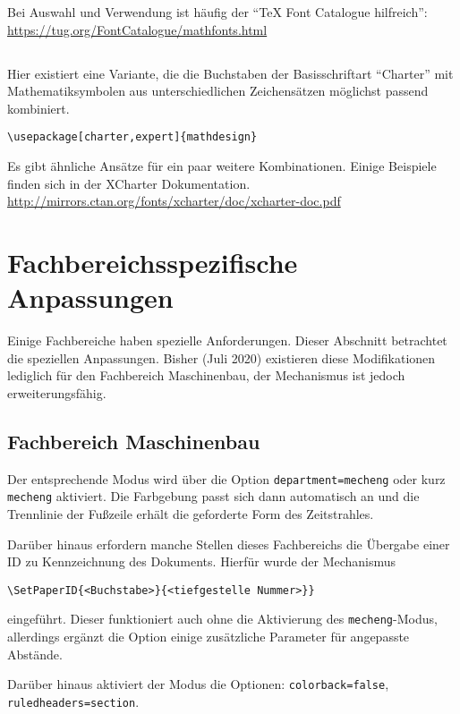 \documentclass[
	german,
	accentcolor=9c,%
	]{tudapub}
\let\code\texttt
\begin{document}
Bei Auswahl und Verwendung ist häufig der \enquote{\TeX{} Font Catalogue hilfreich}: \url{https://tug.org/FontCatalogue/mathfonts.html}

\subsection{}
Hier existiert eine Variante, die die Buchstaben der Basisschriftart \enquote{Charter} mit Mathematiksymbolen aus unterschiedlichen Zeichensätzen möglichst passend kombiniert.

\begin{verbatim}
\usepackage[charter,expert]{mathdesign}
\end{verbatim}

Es gibt ähnliche Ansätze für ein paar weitere Kombinationen. Einige Beispiele finden sich in der XCharter Dokumentation. \url{http://mirrors.ctan.org/fonts/xcharter/doc/xcharter-doc.pdf}


\section{Fachbereichsspezifische Anpassungen}
Einige Fachbereiche haben spezielle Anforderungen. Dieser Abschnitt betrachtet die speziellen Anpassungen. Bisher (Juli 2020) existieren diese Modifikationen lediglich für den Fachbereich Maschinenbau, der Mechanismus ist jedoch erweiterungsfähig.


\subsection{Fachbereich Maschinenbau}
Der entsprechende Modus wird über die Option \code{department=mecheng} oder kurz \code{mecheng} aktiviert. Die Farbgebung passt sich dann automatisch an und die Trennlinie der Fußzeile erhält die geforderte Form des Zeitstrahles. 

Darüber hinaus erfordern manche Stellen dieses Fachbereichs die Übergabe einer ID zu Kennzeichnung des Dokuments. Hierfür wurde der Mechanismus
\begin{verbatim}
\SetPaperID{<Buchstabe>}{<tiefgestelle Nummer>}}
\end{verbatim}
eingeführt.
Dieser funktioniert auch ohne die Aktivierung des \code{mecheng}-Modus, allerdings ergänzt die Option einige zusätzliche Parameter für angepasste Abstände.

Darüber hinaus aktiviert der Modus die Optionen:
\code{colorback=false}, \code{ruledheaders=section}.
\end{document}
